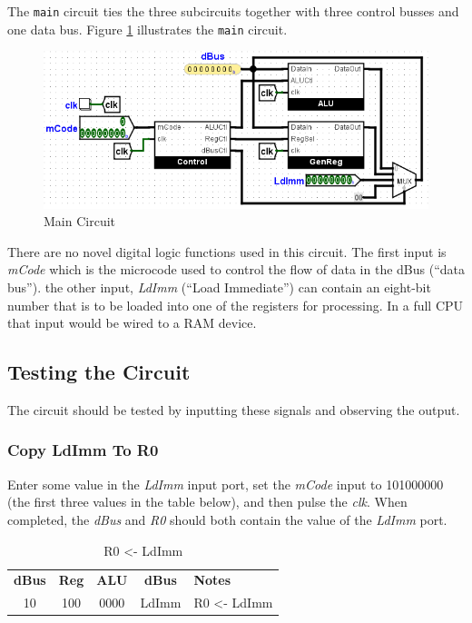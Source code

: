 The \lstinline[columns=fixed]|main| circuit ties the three subcircuits together with three control busses and one data bus. Figure \ref{fig:11-06} illustrates the \lstinline[columns=fixed]|main| circuit.

\begin{figure}[H]
	\centering
	\includegraphics[width=\maxwidth{.95\linewidth}]{gfx/11-06}
	\caption{Main Circuit}
	\label{fig:11-06}
\end{figure}

There are no novel digital logic functions used in this circuit. The first input is \textit{mCode} which is the microcode used to control the flow of data in the dBus (``data bus''). the other input, \textit{LdImm} (``Load Immediate'') can contain an eight-bit number that is to be loaded into one of the registers for processing. In a full \ac{CPU} that input would be wired to a \ac{RAM} device.

\subsection{Testing the Circuit}

The circuit should be tested by inputting these signals and observing the output.

\subsubsection{Copy LdImm To R0}
Enter some value in the \textit{LdImm} input port, set the \textit{mCode} input to 101000000 (the first three values in the table below), and then pulse the \textit{clk}. When completed, the \textit{dBus} and \textit{R0} should both contain the value of the \textit{LdImm} port.

\begin{table}[H]
	\sffamily
	\newcommand{\head}[1]{\textcolor{white}{\textbf{#1}}}		
	\begin{center}
		\begin{tabular}{ccccl} 
			\textbf{dBus} & \textbf{Reg} & \textbf{ALU} & \textbf{dBus} & \textbf{Notes} \\
			10 & 100 & 0000 & LdImm & R0 <- LdImm \\
		\end{tabular}
	\end{center}
	\caption{R0 <- LdImm}
	\label{tab:11-01}
\end{table}


